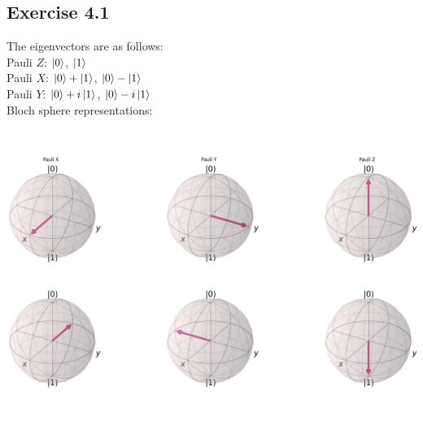 \documentclass[a4paper,12pt]{article}
\begin{document}
\subsection*{Exercise 4.1}
The eigenvectors are as follows:\\
Pauli $Z$: $\ket{0}$, $\ket{1}$\\
Pauli $X$: $\ket{0}+\ket{1}$, $\ket{0}-\ket{1}$\\
Pauli $Y$: $\ket{0}+i\ket{1}$, $\ket{0}-i\ket{1}$\\
Bloch sphere representations:

\includegraphics*[scale=0.4]{4.1.png}
\end{document}
